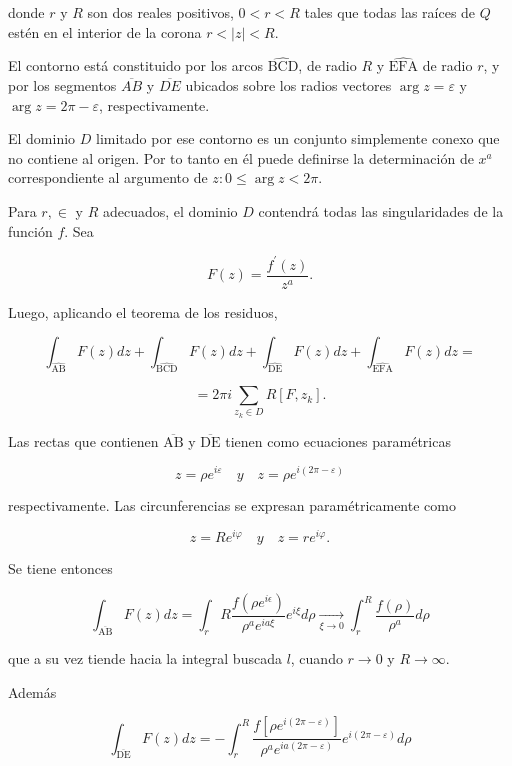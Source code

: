 \documentclass[10pt]{article}
\theoremstyle{plain}
\theoremstyle{definition}
\theoremstyle{remark}
\begin{document}
donde $r$ y $R$ son dos reales positivos, $0<r<R$ tales que todas las raíces de $Q$ estén en el interior de la corona $r<|z|<R$.

El contorno está constituido por los arcos $\widehat{\mathrm{BCD}}$, de radio $R$ y $\widehat{\mathrm{EFA}}$ de radio $r$, y por los segmentos $\overline{A B}$ y $\overline{D E}$ ubicados sobre los radios vectores $\arg z=\varepsilon$ y $\arg z=2 \pi-\varepsilon$, respectivamente.

El dominio $D$ limitado por ese contorno es un conjunto simplemente conexo que no contiene al origen. Por to tanto en él puede definirse la determinación de $x^{a}$ correspondiente al argumento de $z: 0 \leqslant \arg z<2 \pi$.

Para $r, \in$ y $R$ adecuados, el dominio $D$ contendrá todas las singularidades de la función $f$. Sea

$$
F(z)=\frac{f^{\prime}(z)}{z^{a}} .
$$

Luego, aplicando el teorema de los residuos,

$$
\int_{\widehat{\mathrm{AB}}} F(z) d z+\int_{\widehat{\mathrm{BCD}}} F(z) d z+\int_{\widehat{\mathrm{DE}}} F(z) d z+\int_{\widehat{\mathrm{EFA}}} F(z) d z=
$$


\begin{equation*}
=2 \pi i \sum_{z_{k} \in D} R\left[F, z_{k}\right] . \tag{27.1}
\end{equation*}


Las rectas que contienen $\overline{\mathrm{AB}}$ y $\overline{\mathrm{DE}}$ tienen como ecuaciones paramétricas

$$
z=\rho e^{i \varepsilon} \quad y \quad z=\rho e^{i(2 \pi-\varepsilon)}
$$

respectivamente. Las circunferencias se expresan paramétricamente como

$$
z=R e^{i \varphi} \quad y \quad z=r e^{i \varphi} .
$$

Se tiene entonces

$$
\int_{\overline{\mathrm{AB}}} F(z) d z=\int_{r} R \frac{f\left(\rho e^{i \epsilon}\right)}{\rho^{a} e^{i a \xi}} e^{i \xi} d \rho \xrightarrow[\xi \rightarrow 0]{ } \int_{r}^{R} \frac{f(\rho)}{\rho^{a}} d \rho
$$

que a su vez tiende hacia la integral buscada $l$, cuando $r \rightarrow 0$ y $R \rightarrow \infty$.

Además

$$
\int_{\overline{\mathrm{DE}}} F(z) d z=-\int_{r}^{R} \frac{f\left[\rho e^{i(2 \pi-\varepsilon)}\right]}{\rho^{a} e^{i a(2 \pi-\varepsilon)}} e^{i(2 \pi-\varepsilon)} d \rho
$$
\end{document}
